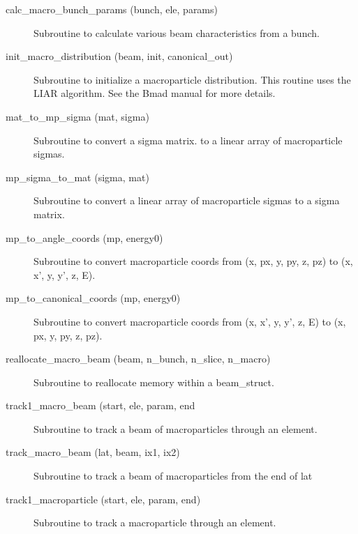 \begin{description}

\item[calc_macro_bunch_params (bunch, ele, params)] \Newline
Subroutine to calculate various beam characteristics from a bunch.

\item[init_macro_distribution (beam, init, canonical_out)] \Newline 
Subroutine to initialize a macroparticle distribution.
This routine uses the LIAR algorithm. See the Bmad manual for more details.

\item[mat_to_mp_sigma (mat, sigma)] \Newline 
Subroutine to convert a sigma matrix. to a linear array of 
macroparticle sigmas.

\item[mp_sigma_to_mat (sigma, mat)] \Newline 
Subroutine to convert a linear array of macroparticle sigmas to a 
sigma matrix. 

\item[mp_to_angle_coords (mp, energy0)] \Newline 
Subroutine to convert macroparticle coords from 
(x, px, y, py, z, pz) to (x, x', y, y', z, E).

\item[mp_to_canonical_coords (mp, energy0)] \Newline 
Subroutine to convert macroparticle coords from 
(x, x', y, y', z, E) to (x, px, y, py, z, pz).

\item[reallocate_macro_beam (beam, n_bunch, n_slice, n_macro)] \Newline 
Subroutine to reallocate memory within a beam_struct.

\item[track1_macro_beam (start, ele, param, end] \Newline
Subroutine to track a beam of macroparticles through an element.

\item[track_macro_beam (lat, beam, ix1, ix2)] \Newline 
Subroutine to track a beam of macroparticles from the end of
lat%

\item[track1_macroparticle (start, ele, param, end)] \Newline 
Subroutine to track a macroparticle through an element.

\end{description}

